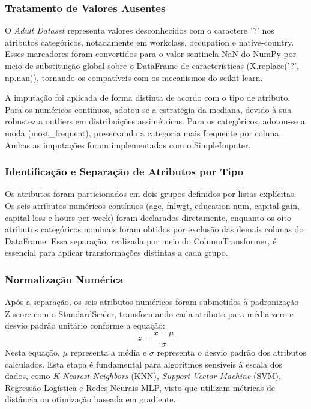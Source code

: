 \subsubsection{Tratamento de Valores Ausentes}
O \textit{Adult Dataset} representa valores desconhecidos com o caractere '?' nos atributos categóricos, notadamente em workclass, occupation e native-country. Esses marcadores foram convertidos para o valor sentinela NaN do NumPy por meio de substituição global sobre o DataFrame de características (X.replace('?', np.nan)), tornando-os compatíveis com os mecanismos do scikit-learn.

A imputação foi aplicada de forma distinta de acordo com o tipo de atributo. Para os numéricos contínuos, adotou-se a estratégia da mediana, devido à sua robustez a outliers em distribuições assimétricas. Para os categóricos, adotou-se a moda (most\_frequent), preservando a categoria mais frequente por coluna. Ambas as imputações foram implementadas com o SimpleImputer.

\subsubsection{Identificação e Separação de Atributos por Tipo}
Os atributos foram particionados em dois grupos definidos por listas explícitas. Os seis atributos numéricos contínuos (age, fnlwgt, education-num, capital-gain, capital-loss e hours-per-week) foram declarados diretamente, enquanto os oito atributos categóricos nominais foram obtidos por exclusão das demais colunas do DataFrame. Essa separação, realizada por meio do ColumnTransformer, é essencial para aplicar transformações distintas a cada grupo.

\subsubsection{Normalização Numérica}
Após a separação, os seis atributos numéricos foram submetidos à padronização Z-score com o StandardScaler, transformando cada atributo para média zero e desvio padrão unitário conforme a equação: 
$$z=\frac{x-\mu}{\sigma}$$
Nesta equação, $\mu$ representa a média e $\sigma$ representa o desvio padrão dos atributos calculados. Esta etapa é fundamental para algoritmos sensíveis à escala dos dados, como \textit{K-Nearest Neighbors} (KNN), \textit{Support Vector Machine} (SVM), Regressão Logística e Redes Neurais MLP, visto que utilizam métricas de distância ou otimização baseada em gradiente.


